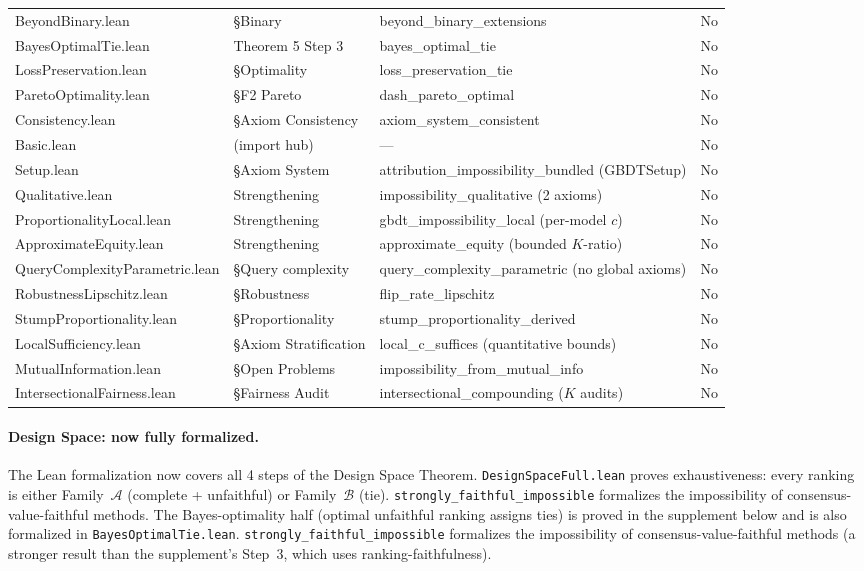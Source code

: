\documentclass{article}
\begin{document}
\begin{table}[htbp]
\begin{tabular}{@{}l>{\raggedright\arraybackslash}p{3cm}>{\raggedright\arraybackslash}p{5.5cm}l@{}}
BeyondBinary.lean & \S Binary & beyond\_binary\_extensions & No \\
BayesOptimalTie.lean & Theorem 5 Step 3 & bayes\_optimal\_tie & No \\
LossPreservation.lean & \S Optimality & loss\_preservation\_tie & No \\
ParetoOptimality.lean & \S F2 Pareto & dash\_pareto\_optimal & No \\
Consistency.lean & \S Axiom Consistency & axiom\_system\_consistent & No \\
Basic.lean & (import hub) & --- & No \\
Setup.lean & \S Axiom System & attribution\_impossibility\_bundled (GBDTSetup) & No \\
Qualitative.lean & Strengthening & impossibility\_qualitative (2 axioms) & No \\
ProportionalityLocal.lean & Strengthening & gbdt\_impossibility\_local (per-model $c$) & No \\
ApproximateEquity.lean & Strengthening & approximate\_equity (bounded $K$-ratio) & No \\
QueryComplexityParametric.lean & \S Query complexity & query\_complexity\_parametric (no global axioms) & No \\
RobustnessLipschitz.lean & \S Robustness & flip\_rate\_lipschitz & No \\
StumpProportionality.lean & \S Proportionality & stump\_proportionality\_derived & No \\
LocalSufficiency.lean & \S Axiom Stratification & local\_c\_suffices (quantitative bounds) & No \\
MutualInformation.lean & \S Open Problems & impossibility\_from\_mutual\_info & No \\
IntersectionalFairness.lean & \S Fairness Audit & intersectional\_compounding ($K$ audits) & No \\
\bottomrule
\end{tabular}
\end{table}

\paragraph{Design Space: now fully formalized.}
The Lean formalization now covers all 4 steps of the Design Space Theorem.
\texttt{DesignSpaceFull.lean} proves exhaustiveness: every ranking is
either Family~$\mathcal{A}$ (complete + unfaithful) or Family~$\mathcal{B}$
(tie). \texttt{strongly\_faithful\_impossible} formalizes the impossibility
of consensus-value-faithful methods.
The Bayes-optimality half (optimal unfaithful ranking assigns ties) is
proved in the supplement below and is also formalized in
\texttt{BayesOptimalTie.lean}. \texttt{strongly\_faithful\_impossible}
formalizes the impossibility of consensus-value-faithful methods (a
stronger result than the supplement's Step~3, which uses
ranking-faithfulness).
\end{document}
